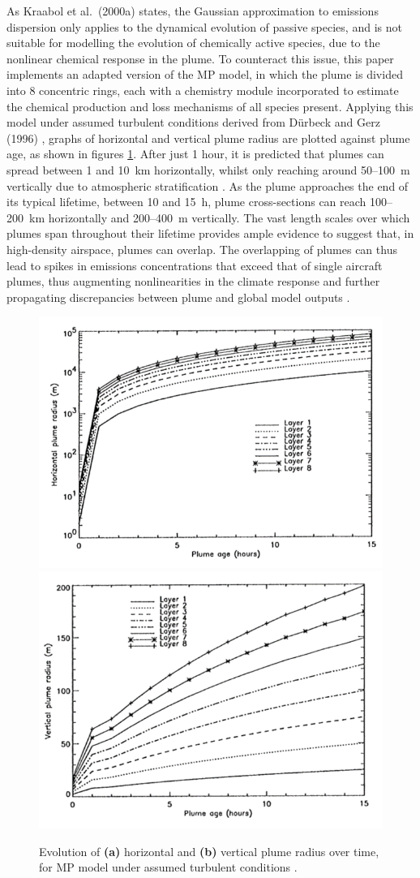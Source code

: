 As Kraabol et al.\ (2000a) \cite{Kraabol2000a} states, the Gaussian approximation to emissions dispersion only applies to the dynamical evolution of passive species, and is not suitable for modelling the evolution of chemically active species, due to the nonlinear chemical response in the plume. To counteract this issue, this paper implements an adapted version of the MP model, in which the plume is divided into 8 concentric rings, each with a chemistry module incorporated to estimate the chemical production and loss mechanisms of all species present. Applying this model under assumed turbulent conditions derived from D{\"u}rbeck and Gerz (1996) \cite{Durbeck1996}, graphs of horizontal and vertical plume radius are plotted against plume age, as shown in figures \ref{Kraabol}. After just 1 hour, it is predicted that plumes can spread between 1 and 10~km horizontally, whilst only reaching around 50--100~m vertically due to atmospheric stratification \cite{Durbeck1995}. As the plume approaches the end of its typical lifetime, between 10 and 15~h, plume cross-sections can reach 100--200~km horizontally and 200--400~m vertically. The vast length scales over which plumes span throughout their lifetime provides ample evidence to suggest that, in high-density airspace, plumes can overlap. The overlapping of plumes can thus lead to spikes in emissions concentrations that exceed that of single aircraft plumes, thus augmenting nonlinearities in the climate response and further propagating discrepancies between plume and global model outputs \cite{Schlager1997}. 


\begin{figure}[H]
	\centering
	\subfloat
		{
\centering
		\includegraphics[width=.36\textwidth]{Kraabol1.png}
		}
	\subfloat
		{
\centering
		\includegraphics[width=.36\textwidth]{Kraabol2.png}
		}
	\caption{Evolution of \textbf{(a)} horizontal and \textbf{(b)} vertical plume radius over time, for MP model under assumed turbulent conditions \cite{Kraabol2000a}.}
	\label{Kraabol}
\end{figure}

